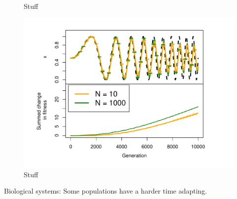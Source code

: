 \documentclass[10pt]{article}\usepackage[]{graphicx}\usepackage[]{color}
\makeatletter
\def\maxwidth{ %
  \ifdim\Gin@nat@width>\linewidth
    \linewidth
  \else
    \Gin@nat@width
  \fi
}
\theoremstyle{plain}
\makeatother
\begin{document}
\begin{multicols*}{2}
\begin{Schunk}
\begin{figure}[H]
{}

\caption[Stuff]{Stuff}\label{fig:fisherd}
\end{figure}
\end{Schunk}
\begin{Schunk}
\begin{figure}[H]

{\centering \includegraphics[width=\maxwidth]{figure/twocolumn-fisherd_ext-1} 

}

\caption[Stuff]{Stuff}\label{fig:fisherd_ext}
\end{figure}
\end{Schunk}

Biological systems: Some populations have a harder time adapting.


\end{multicols*}
\end{document}
